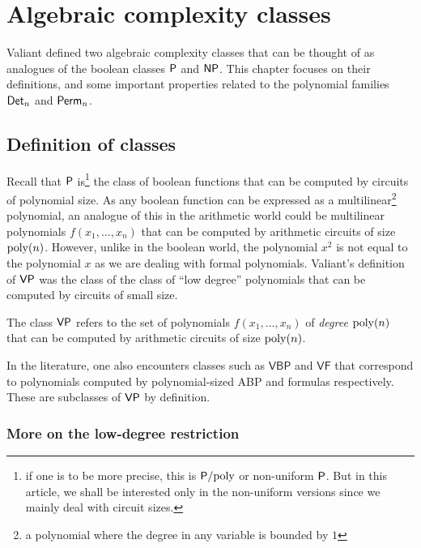 \chapter{Algebraic complexity classes} \label{chap-vpvnp}

Valiant \cite{v79} defined two algebraic complexity classes that can be thought of as analogues of the boolean classes $\P$ and $\mathsf{NP}$. This chapter focuses on their definitions, and some important properties related to the polynomial families $\mathsf{Det}_n$ and $\mathsf{Perm}_n$. 

\section{Definition of classes}

Recall that $\P$ is\footnote{if one is to be more precise, this is $\mathsf{P}/\mathrm{poly}$ or non-uniform $\P$. But in this article, we shall be interested only in the non-uniform versions since we mainly deal with circuit sizes.} the class of boolean functions that can be computed by circuits of polynomial size. As any boolean function can be expressed as a multilinear\footnote{a polynomial where the degree in any variable is bounded by $1$} polynomial, an analogue of this in the arithmetic world could be multilinear polynomials $f(x_1,\dots, x_n)$ that can be computed by arithmetic circuits of size $\mathrm{poly}(n)$. However, unlike in the boolean world, the polynomial $x^2$ is not equal to the polynomial $x$ as we are dealing with formal polynomials. Valiant's definition of $\mathsf{VP}$ was the class of the class of ``low degree'' polynomials that can be computed by circuits of small size. 

\begin{definition}[Valiant's $\P$]\label{defn:vp}
The class $\mathsf{VP}$ refers to the set of polynomials $f(x_1,\dots, x_n)$ of \emph{degree $\mathrm{poly}(n)$} that can be computed by arithmetic circuits of size $\mathrm{poly}(n)$. 
\end{definition}

In the literature, one also encounters classes such as $\mathsf{VBP}$ and $\mathsf{VF}$ that correspond to polynomials computed by polynomial-sized ABP and formulas respectively. These are subclasses of $\mathsf{VP}$ by definition. 


\subsection*{More on the low-degree restriction}

